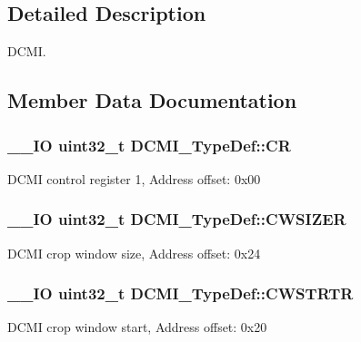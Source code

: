 \subsection{Detailed Description}
D\+C\+M\+I. 

\subsection{Member Data Documentation}
\hypertarget{struct_d_c_m_i___type_def_a3cfcc9860ca551cbcb10c1c3dd4304f0}{}
\subsubsection[{C\+R}]{\setlength{\rightskip}{0pt plus 5cm}\+\_\+\+\_\+\+I\+O uint32\+\_\+t D\+C\+M\+I\+\_\+\+Type\+Def\+::\+C\+R}\label{struct_d_c_m_i___type_def_a3cfcc9860ca551cbcb10c1c3dd4304f0}
D\+C\+M\+I control register 1, Address offset\+: 0x00 \hypertarget{struct_d_c_m_i___type_def_a1b9c8048339e19b110ecfbea486f55df}{}
\subsubsection[{C\+W\+S\+I\+Z\+E\+R}]{\setlength{\rightskip}{0pt plus 5cm}\+\_\+\+\_\+\+I\+O uint32\+\_\+t D\+C\+M\+I\+\_\+\+Type\+Def\+::\+C\+W\+S\+I\+Z\+E\+R}\label{struct_d_c_m_i___type_def_a1b9c8048339e19b110ecfbea486f55df}
D\+C\+M\+I crop window size, Address offset\+: 0x24 \hypertarget{struct_d_c_m_i___type_def_a4d58830323e567117c12ae3feac613b9}{}
\subsubsection[{C\+W\+S\+T\+R\+T\+R}]{\setlength{\rightskip}{0pt plus 5cm}\+\_\+\+\_\+\+I\+O uint32\+\_\+t D\+C\+M\+I\+\_\+\+Type\+Def\+::\+C\+W\+S\+T\+R\+T\+R}\label{struct_d_c_m_i___type_def_a4d58830323e567117c12ae3feac613b9}
D\+C\+M\+I crop window start, Address offset\+: 0x20 \hypertarget{struct_d_c_m_i___type_def_a266cec1031b0be730b0e35523f5e2934}{}

